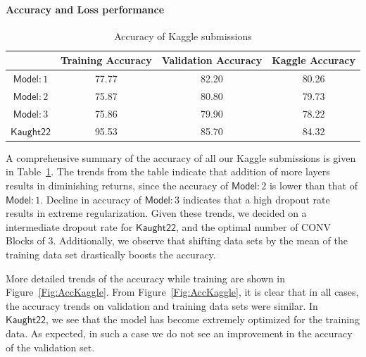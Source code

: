 \documentclass[]{article}
\newcommand*{\K}{\ensuremath{\mathsf{Kaught22}}}
\newcommand*{\Model}[1]{\ensuremath{\mathsf{Model}}:#1}
\begin{document}
\paragraph{Accuracy and Loss performance}

\begin{table}[t]
\centering
\begin{tabular}{|c|c|c|c|}
\hline
            & \textbf{Training Accuracy} & \textbf{Validation Accuracy} & \textbf{Kaggle Accuracy} \\ \hline
$\Model{1}$ & 77.77                      & 82.20                        & 80.26                    \\ \hline
$\Model{2}$ & 75.87                      & 80.80                        & 79.73                    \\ \hline
$\Model{3}$ & 75.86                      & 79.90                        & 78.22                    \\ \hline
$\K$        & 95.53                      & 85.70                        & 84.32                    \\ \hline
\end{tabular}
\caption{Accuracy of Kaggle submissions}
\label{Tbl:Accuracy}
\end{table}

A comprehensive summary of the accuracy of all our Kaggle submissions is given in Table~\ref{Tbl:Accuracy}. The trends from the table indicate that addition of more layers results in diminishing returns, since the accuracy of $\Model{2}$ is lower than that of $\Model{1}$. Decline in accuracy of $\Model{3}$ indicates that a high dropout rate results in extreme regularization. Given these trends, we decided on a intermediate dropout rate for $\K$, and the optimal number of CONV Blocks of 3. Additionally, we observe that shifting data sets by the mean of the training data set drastically boosts the accuracy. 

More detailed trends of the accuracy while training are shown in Figure~\ref{Fig:AccKaggle}. From Figure~\ref{Fig:AccKaggle}, it is clear that in all cases, the accuracy trends on validation and training data sets were similar. In $\K$, we see that the model has become extremely optimized for the training data. As expected, in such a case we do not see an improvement in the accuracy of the validation set. 
\end{document}
